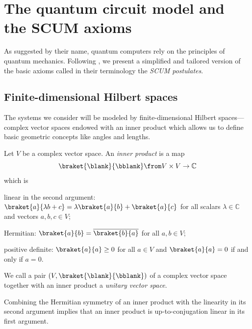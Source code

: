 \documentclass[a4paper,oneside, 12pt]{amsart}
\begin{document}
\section{The quantum circuit model and the SCUM axioms}\label{sec:the-quantum-circuit-model-and-the-scum-axioms}
As suggested by their name, quantum computers rely on the principles of quantum mechanics.
Following \cite[Section~2]{kissinger-wetering2025:PicturingQuantumSoftware}, we present a simplified and tailored version of the basic axioms called in their terminology the  \emph{SCUM postulates}.

\subsection{Finite-dimensional Hilbert spaces}\label{sec:finite-dimensional-hilbert-spaces}
The systems we consider will be modeled by finite-dimensional Hilbert spaces---complex vector spaces endowed with an inner product which allows us to define basic geometric concepts like angles and lengths.


\begin{definition}\label{def:unitary-vector-space}
  Let \(V\) be a complex vector space.
  An \emph{inner product} is a map
  \begin{equation*}
    \braket{\blank}{\bblank} \from V\times V \to \mathbb{C}
  \end{equation*}
  which is
  \begin{thmlist}
    \item linear in the second argument: \(\braket{a}{\lambda b + c} = \lambda \braket{a}{b} + \braket{a}{c}\) for all scalars \(\lambda \in \mathbb{C}\) and vectors \(a,b,c \in V\);
    \item Hermitian: \(\braket{a}{b} = \overline{\braket{b}{a}}\) for all \(a, b \in V\);
    \item positive definite: \(\braket{a}{a} \geq 0 \)  for all \(a\in V\) and \(\braket{a}{a} = 0\) if and only if \(a = 0\).
  \end{thmlist}
  We call a pair \((V, \braket{\blank}{\bblank})\) of a complex vector space together with an inner product a \emph{unitary vector space}.
\end{definition}

Combining the Hermitian symmetry of an inner product with the linearity in its second argument implies that an inner product is up-to-conjugation linear in its first argument.
\end{document}
